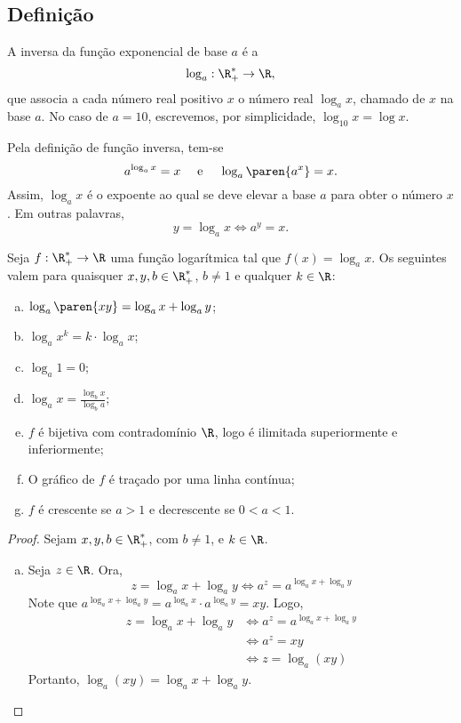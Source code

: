 \subsection{Definição}

\begin{definition}
A inversa da função exponencial de base $a$ é a 
$$\log_a : \R_+^* \to \R,$$
que associa a cada número real positivo $x$ o número real $\log_a
x$, chamado  de $x$ na base $a$. No caso de $a=10$,
escrevemos, por simplicidade, $\log_{10}x = \log x$.
\end{definition}

\begin{remark}
    Pela definição de função inversa, tem-se
$$ a^{\log_a x}=x \ \ \ \text{ e } \ \ \ \log_a \paren{a^x} = x.$$
Assim, $\log_a x $ é o expoente ao qual se deve elevar a base $a$
para obter o número $x$. Em outras palavras,
$$ y = \log_a x \iff a^y = x.$$
\end{remark}

\begin{proposition}
    Seja $f: \R_+^* \to \R$ uma função logarítmica tal que $f(x) =
\log_a x$. Os seguintes valem para quaisquer  $x, y, b \in
\R_+^*$, $b \neq 1$ e qualquer $k \in \R$:
\begin{enumerate}[(a)]
  \item $\log_a \paren{xy} = \log_a x + \log_a y$;
  \item $\log_a x^k = k\cdot \log_a x$;
  \item $\log_a 1 = 0$;
  \item $\log_a x = \frac{\log_b x}{\log_b a}$;
  \item $f$ é bijetiva com contradomínio $\R$, logo é ilimitada superiormente e inferiormente;
  \item O gráfico de $f$ é traçado por uma linha contínua;
  \item $f$ é crescente se $a>1$ e decrescente se $0<a<1$.
\end{enumerate}
\end{proposition}

\begin{proof}
    Sejam $x, y, b \in \R_+^*$, com $b \neq 1$, e $k \in \R$.
    \begin{enumerate}[(a)]
        \item 
        Seja $z \in \R$. Ora,
        \[
            z = \log_a x + \log_a y \iff a^z = a^{\log_a x + \log_a y} 
        \]
        Note que $a^{\log_a x + \log_a y}  = a^{\log_a x} \cdot a^{\log_a y} = xy$.
        Logo, 
        \begin{align*}
            z = \log_a x + \log_a y & \iff a^z = a^{\log_a x + \log_a y}\\
            & \iff a^z = xy \\
            & \iff z = \log_a(xy)
        \end{align*}
        Portanto, $\log_a(xy)=\log_a x + \log_a y$.
    \end{enumerate}
\end{proof}

